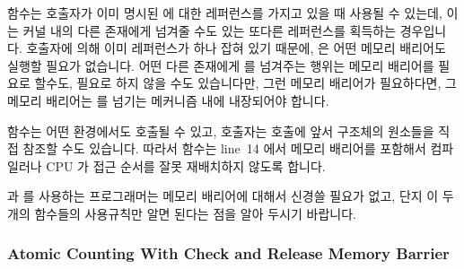  함수는 호출자가 이미 명시된  에 대한 레퍼런스를
가지고 있을 때 사용될 수 있는데, 이는 커널 내의 다른 존재에게 넘겨줄 수도 있는
또다른 레퍼런스를 획득하는 경우입니다.
호출자에 의해 이미 레퍼런스가 하나 잡혀 있기 때문에,  은 어떤
메모리 배리어도 실행할 필요가 없습니다.
어떤 다른 존재에게  를 넘겨주는 행위는 메모리 배리어를 필요로
할수도, 필요로 하지 않을 수도 있습니다만, 그런 메모리 배리어가 필요하다면, 그
메모리 배리어는  를 넘기는 메커니즘 내에 내장되어야 합니다.
\iffalse

The \co{dst_clone()} primitive may be used if the caller
already has a reference to the specified \co{dst_entry},
in which case it obtains another reference that may be handed off
to some other entity within the kernel.
Because a reference is already held by the caller, \co{dst_clone()}
need not execute any memory barriers.
The act of handing the \co{dst_entry} to some other entity might
or might not require a memory barrier, but if such a memory barrier
is required, it will be embedded in the mechanism used to hand the
\co{dst_entry} off.
\fi

 함수는 어떤 환경에서도 호출될 수 있고, 호출자는
 호출에 앞서  구조체의 원소들을 직접 참조할
수도 있습니다.
따라서  함수는 line~14 에서 메모리 배리어를 포함해서
컴파일러나 CPU 가 접근 순서를 잘못 재배치하지 않도록 합니다.

 과  를 사용하는 프로그래머는 메모리 배리어에
대해서 신경쓸 필요가 없고, 단지 이 두개의 함수들의 사용규칙만 알면 된다는
점을 알아 두시기 바랍니다.
\iffalse

The \co{dst_release()} primitive may be invoked from any environment,
and the caller might well reference elements of the \co{dst_entry}
structure immediately prior to the call to \co{dst_release()}.
The \co{dst_release()} primitive therefore contains a memory
barrier on line~14 preventing both the compiler and the CPU
from misordering accesses.

Please note that the programmer making use of \co{dst_clone()} and
\co{dst_release()} need not be aware of the memory barriers, only
of the rules for using these two primitives.
\fi

\subsubsection{Atomic Counting With Check and Release Memory Barrier}
\label{sec:together:Atomic Counting With Check and Release Memory Barrier}

